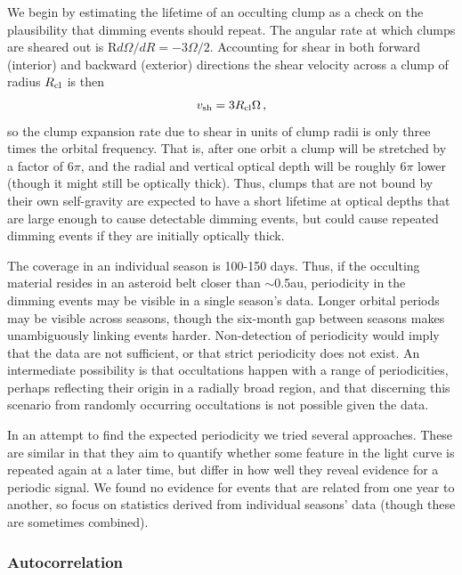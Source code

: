 \documentclass[]{rsos}
\begin{document}
We begin by estimating the lifetime of an occulting clump as a check on the plausibility
that dimming events should repeat. The angular rate at which clumps are sheared
  out is R$d \Omega / dR = - 3 \Omega / 2$. Accounting for shear in both forward
  (interior) and backward (exterior) directions the shear velocity across a clump of
  radius $R_{\rm cl}$ is then
\begin{equation}\label{eq:shear}
  v_{\rm sh} = 3 R_{\rm cl} \Omega \, ,
\end{equation}
so the clump expansion rate due to shear in units of clump radii is only three times the
orbital frequency. That is, after one orbit a clump will be stretched by a factor of
$6\pi$, and the radial and vertical optical depth will be roughly $6\pi$ lower (though it
might still be optically thick). Thus, clumps that are not bound by their own
self-gravity are expected to have a short lifetime at optical depths that are large
enough to cause detectable dimming events, but could cause repeated dimming events if
they are initially optically thick.

The coverage in an individual season is 100-150 days. Thus, if the occulting material
resides in an asteroid belt closer than $\sim$0.5au, periodicity in the dimming events
may be visible in a single season's data. Longer orbital periods may be visible across
seasons, though the six-month gap between seasons makes unambiguously linking events
harder. Non-detection of periodicity would imply that the data are not sufficient, or
that strict periodicity does not exist. An intermediate possibility is that occultations
happen with a range of periodicities, perhaps reflecting their origin in a radially broad
region, and that discerning this scenario from randomly occurring occultations is not
possible given the data.

In an attempt to find the expected periodicity we tried several approaches. These are
similar in that they aim to quantify whether some feature in the light curve is repeated
again at a later time, but differ in how well they reveal evidence for a periodic
signal. We found no evidence for events that are related from one year to another, so
focus on statistics derived from individual seasons' data (though these are sometimes
combined).

\subsubsection{Autocorrelation}\label{sss:auto}
\end{document}
